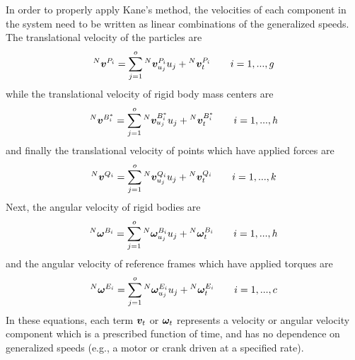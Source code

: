 In order to properly apply Kane's method, the velocities of each component in
the system need to be written as linear combinations of the generalized speeds.
The translational velocity of the particles are
\begin{align}
\label{eq:particle_translational}
{^N}\boldsymbol{v}^{P_i} = \sum^o_{j=1} {^N}\boldsymbol{v}^{P_i}_{u_j} u_j + {^N}\boldsymbol{v}^{P_i}_t
\quad \quad i=1,...,g
\end{align}
while the translational velocity of rigid body mass centers are
\begin{align}
\label{eq:rb_translational}
{^N}\boldsymbol{v}^{B_i^*} = \sum_{j=1}^o {^N}\boldsymbol{v}^{B_i^*}_{u_j} u_j +
{^N}\boldsymbol{v}^{B_i^*}_t \quad \quad i=1,...,h
\end{align}
and finally the translational velocity of points which have applied forces are
\begin{align}
\label{eq:points_translational}
{^N}\boldsymbol{v}^{Q_i} = \sum_{j=1}^o {^N}\boldsymbol{v}^{Q_i}_{u_j} u_j + {^N}\boldsymbol{v}^{Q_i}_t
\quad \quad i=1,...,k
\end{align}
Next, the angular velocity of rigid bodies are
\begin{align}
\label{eq:rb_rotational_bodies}
{^N}\boldsymbol{\omega}^{B_i} = \sum_{j=1}^o {^N}\boldsymbol{\omega}^{B_i}_{u_j} u_j +
{^N}\boldsymbol{\omega}^{B_i}_t \quad \quad i=1,...,h
\end{align}
and the angular velocity of reference frames which have applied torques are
\begin{align}
\label{eq:rb_rotational_frames}
{^N}\boldsymbol{\omega}^{E_i} = \sum_{j=1}^o {^N}\boldsymbol{\omega}^{E_i}_{u_j} u_j +
{^N}\boldsymbol{\omega}^{E_i}_t \quad \quad i=1,...,c
\end{align}
In these equations, each term $\boldsymbol{v}_t$ or $\boldsymbol{\omega}_t$ represents a
velocity or angular velocity component which is a prescribed function of time,
and has no dependence on generalized speeds (e.g., a motor or crank driven at a
specified rate).

